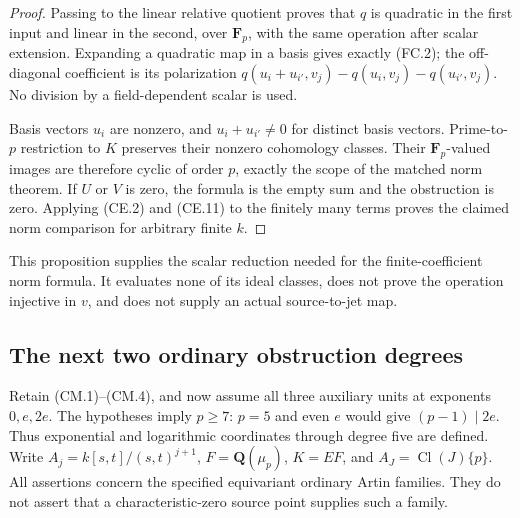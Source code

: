 \documentclass[11pt,a4paper]{article}
\theoremstyle{definition}
\begin{document}
\begin{proof}
Passing to the linear relative quotient proves
that \(q\) is quadratic in the first input and
linear in the second, over \(\mathbf F_p\),
with the same operation after scalar extension.
Expanding a quadratic map in a basis gives
exactly (FC.2); the off-diagonal coefficient
is its polarization
\(q(u_i+u_{i'},v_j)-q(u_i,v_j)-q(u_{i'},v_j)\).
No division by a field-dependent scalar is used.

Basis vectors \(u_i\) are nonzero, and
\(u_i+u_{i'}\ne0\) for distinct basis vectors.
Prime-to-\(p\) restriction to \(K\) preserves
their nonzero cohomology classes.  Their
\(\mathbf F_p\)-valued images are therefore
cyclic of order \(p\), exactly the scope of
the matched norm theorem.  If \(U\) or \(V\)
is zero, the formula is the empty sum and
the obstruction is zero.  Applying (CE.2)
and (CE.11) to the finitely many terms proves
the claimed norm comparison for arbitrary
finite \(k\).
\end{proof}

This proposition supplies the scalar reduction
needed for the finite-coefficient norm formula.
It evaluates none of its ideal classes, does
not prove the operation injective in \(v\),
and does not supply an actual source-to-jet map.



\subsection{The next two ordinary obstruction degrees}
\label{sec:kt-quartic-quintic-obstruction}

Retain (CM.1)--(CM.4), and now assume all three auxiliary units
at exponents \(0,e,2e\).  The hypotheses imply \(p\ge7\):
\(p=5\) and even \(e\) would give \((p-1)\mid2e\).
Thus exponential and logarithmic coordinates through degree five
are defined.  Write \(A_j=k[s,t]/(s,t)^{j+1}\),
\(F=\mathbf Q(\mu_p)\), \(K=EF\), and
\(A_J=\operatorname{Cl}(J)\{p\}\).
All assertions concern the specified equivariant ordinary Artin
families.  They do not assert that a characteristic-zero source
point supplies such a family.
\end{document}
